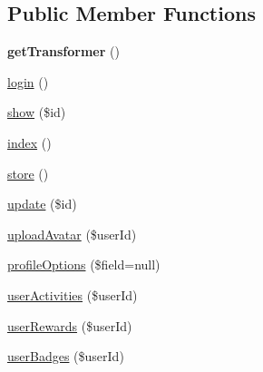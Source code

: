 \subsection*{Public Member Functions}
\begin{DoxyCompactItemize}
\item 
\hypertarget{classDMA_1_1Friends_1_1API_1_1Resources_1_1UserResource_a5b15a62edfd5659a9ce766093a6928c5}{}{\bfseries get\+Transformer} ()\label{classDMA_1_1Friends_1_1API_1_1Resources_1_1UserResource_a5b15a62edfd5659a9ce766093a6928c5}

\item 
\hyperlink{classDMA_1_1Friends_1_1API_1_1Resources_1_1UserResource_a74eb37fa96dc48f66e645d72299b1ba2}{login} ()
\item 
\hyperlink{classDMA_1_1Friends_1_1API_1_1Resources_1_1UserResource_a9d547fde7254643cdaf12cbd5aaca6b4}{show} (\$id)
\item 
\hyperlink{classDMA_1_1Friends_1_1API_1_1Resources_1_1UserResource_a78fa83854826d9c71e7a399d56fa2876}{index} ()
\item 
\hyperlink{classDMA_1_1Friends_1_1API_1_1Resources_1_1UserResource_ace3ce0115f61b8a7425aa9d0a0a92b02}{store} ()
\item 
\hyperlink{classDMA_1_1Friends_1_1API_1_1Resources_1_1UserResource_a94ae693b3b200f00bb6f78d27fd74e32}{update} (\$id)
\item 
\hyperlink{classDMA_1_1Friends_1_1API_1_1Resources_1_1UserResource_a9a6d30979f3f0e54bb951a612c33dca1}{upload\+Avatar} (\$user\+Id)
\item 
\hyperlink{classDMA_1_1Friends_1_1API_1_1Resources_1_1UserResource_a698c671fe201a8881ecee9b4378bf0ec}{profile\+Options} (\$field=null)
\item 
\hyperlink{classDMA_1_1Friends_1_1API_1_1Resources_1_1UserResource_adefa93e29cac582db01b6a49d71184ec}{user\+Activities} (\$user\+Id)
\item 
\hyperlink{classDMA_1_1Friends_1_1API_1_1Resources_1_1UserResource_a738d1d0ddb9e7dccfeef8148985ca24e}{user\+Rewards} (\$user\+Id)
\item 
\hyperlink{classDMA_1_1Friends_1_1API_1_1Resources_1_1UserResource_aa4e6aab6b30d21ca50809a092d16b8df}{user\+Badges} (\$user\+Id)
\end{DoxyCompactItemize}
